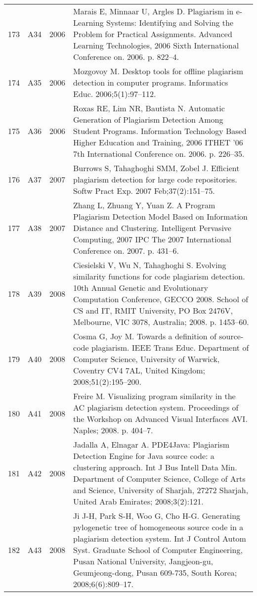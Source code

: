 \documentclass{article}\usepackage[]{graphicx}\usepackage[]{color}
\begin{document}
\begin{longtable}{l|L{1cm}|L{1cm}|L{12cm}|}
  173 & A34 & 2006 & Marais E, Minnaar U, Argles D. Plagiarism in e-Learning Systems: Identifying and Solving the Problem for Practical Assignments. Advanced Learning Technologies, 2006 Sixth International Conference on. 2006. p. 822–4. \\ 
  174 & A35 & 2006 & Mozgovoy M. Desktop tools for offline plagiarism detection in computer programs. Informatics Educ. 2006;5(1):97–112. \\ 
  175 & A36 & 2006 & Roxas RE, Lim NR, Bautista N. Automatic Generation of Plagiarism Detection Among Student Programs. Information Technology Based Higher Education and Training, 2006 ITHET ’06 7th International Conference on. 2006. p. 226–35. \\ 
  176 & A37 & 2007 & Burrows S, Tahaghoghi SMM, Zobel J. Efficient plagiarism detection for large code repositories. Softw Pract Exp. 2007 Feb;37(2):151–75. \\ 
  177 & A38 & 2007 & Zhang L, Zhuang Y, Yuan Z. A Program Plagiarism Detection Model Based on Information Distance and Clustering. Intelligent Pervasive Computing, 2007 IPC The 2007 International Conference on. 2007. p. 431–6. \\ 
  178 & A39 & 2008 & Ciesielski V, Wu N, Tahaghoghi S. Evolving similarity functions for code plagiarism detection. 10th Annual Genetic and Evolutionary Computation Conference, GECCO 2008. School of CS and IT, RMIT University, PO Box 2476V, Melbourne, VIC 3078, Australia; 2008. p. 1453–60. \\ 
  179 & A40 & 2008 & Cosma G, Joy M. Towards a definition of source-code plagiarism. IEEE Trans Educ. Department of Computer Science, University of Warwick, Coventry CV4 7AL, United Kingdom; 2008;51(2):195–200. \\ 
  180 & A41 & 2008 & Freire M. Visualizing program similarity in the AC plagiarism detection system. Proceedings of the Workshop on Advanced Visual Interfaces AVI. Naples; 2008. p. 404–7. \\ 
  181 & A42 & 2008 & Jadalla A, Elnagar A. PDE4Java: Plagiarism Detection Engine for Java source code: a clustering approach. Int J Bus Intell Data Min. Department of Computer Science, College of Arts and Science, University of Sharjah, 27272 Sharjah, United Arab Emirates; 2008;3(2):121. \\ 
  182 & A43 & 2008 & Ji J-H, Park S-H, Woo G, Cho H-G. Generating pylogenetic tree of homogeneous source code in a plagiarism detection system. Int J Control Autom Syst. Graduate School of Computer Engineering, Pusan National University, Jangjeon-gu, Geumjeong-dong, Pusan 609-735, South Korea; 2008;6(6):809–17. \\ 

\end{longtable}
\end{document}
